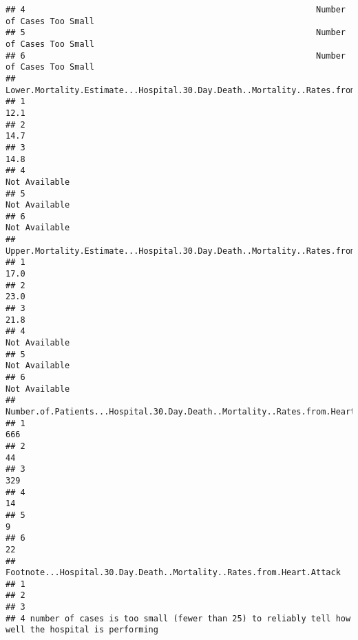 \documentclass[
]{article}
\begin{document}
\begin{verbatim}
## 4                                                           Number of Cases Too Small
## 5                                                           Number of Cases Too Small
## 6                                                           Number of Cases Too Small
##   Lower.Mortality.Estimate...Hospital.30.Day.Death..Mortality..Rates.from.Heart.Attack
## 1                                                                                 12.1
## 2                                                                                 14.7
## 3                                                                                 14.8
## 4                                                                        Not Available
## 5                                                                        Not Available
## 6                                                                        Not Available
##   Upper.Mortality.Estimate...Hospital.30.Day.Death..Mortality..Rates.from.Heart.Attack
## 1                                                                                 17.0
## 2                                                                                 23.0
## 3                                                                                 21.8
## 4                                                                        Not Available
## 5                                                                        Not Available
## 6                                                                        Not Available
##   Number.of.Patients...Hospital.30.Day.Death..Mortality..Rates.from.Heart.Attack
## 1                                                                            666
## 2                                                                             44
## 3                                                                            329
## 4                                                                             14
## 5                                                                              9
## 6                                                                             22
##                                Footnote...Hospital.30.Day.Death..Mortality..Rates.from.Heart.Attack
## 1                                                                                                  
## 2                                                                                                  
## 3                                                                                                  
## 4 number of cases is too small (fewer than 25) to reliably tell how well the hospital is performing

\end{verbatim}
\end{document}
